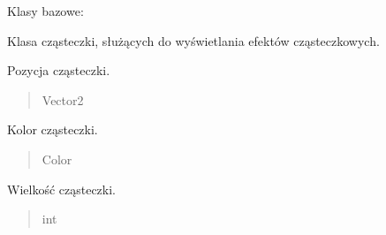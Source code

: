 \documentclass[letterpaper,10pt,polish]{sphinxmanual}
\begin{document}
\begin{fulllineitems}
\label{\detokenize{particle:particle.Particle}}
\pysigstartsignatures
{}
\pysigstopsignatures
\sphinxAtStartPar
Klasy bazowe: 

\sphinxAtStartPar
Klasa cząsteczki, służących do wyświetlania efektów cząsteczkowych.

\begin{fulllineitems}
\label{\detokenize{particle:particle.Particle.pos}}
\pysigstartsignatures
{}
\pysigstopsignatures
\sphinxAtStartPar
Pozycja cząsteczki.
\begin{quote}\begin{description}
\sphinxAtStartPar
Vector2

\end{description}\end{quote}

\end{fulllineitems}


\begin{fulllineitems}
\label{\detokenize{particle:particle.Particle.color}}
\pysigstartsignatures
{}
\pysigstopsignatures
\sphinxAtStartPar
Kolor cząsteczki.
\begin{quote}\begin{description}
\sphinxAtStartPar
Color

\end{description}\end{quote}

\end{fulllineitems}


\begin{fulllineitems}
\label{\detokenize{particle:particle.Particle.size}}
\pysigstartsignatures
{}
\pysigstopsignatures
\sphinxAtStartPar
Wielkość cząsteczki.
\begin{quote}\begin{description}
\sphinxAtStartPar
int


\end{description}
\end{quote}
\end{fulllineitems}
\end{fulllineitems}
\end{document}
